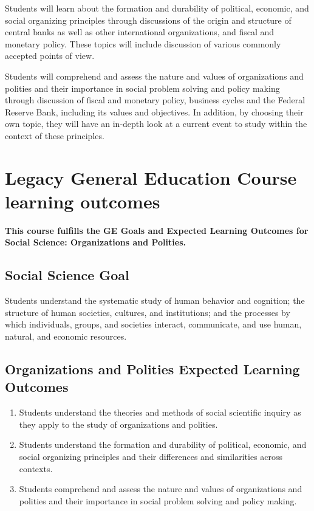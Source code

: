 \documentclass[12pt]{article}
\begin{document}
Students will learn about the formation and durability of political, economic, and social organizing principles through discussions of the origin and structure of central banks as well as other international organizations, and fiscal and monetary policy. These topics will include discussion of various commonly accepted points of view.

Students will comprehend and assess the nature and values of organizations and polities and their importance in social problem solving and policy making through discussion of fiscal and monetary policy, business cycles and the Federal Reserve Bank, including its values and objectives. In addition, by choosing their own topic, they will have an in-depth look at a current event to study within the context of these principles.

\newpage

\section*{Legacy General Education Course learning outcomes}

\textbf{This course fulfills the GE Goals and Expected Learning Outcomes for Social Science: Organizations and Polities.}

\subsection*{Social Science Goal}

Students understand the systematic study of human behavior and cognition; the structure of human societies, cultures, and institutions; and the processes by which individuals, groups, and societies interact, communicate, and use human, natural, and economic resources.

\subsection*{Organizations and Polities Expected Learning Outcomes}
\begin{enumerate}
    \item Students understand the theories and methods of social scientific inquiry as they apply to the study of organizations and polities.
    \item Students understand the formation and durability of political, economic, and social organizing principles and their differences and similarities across contexts.
    \item Students comprehend and assess the nature and values of organizations and polities and their importance in social problem solving and policy making.
\end{enumerate}
\end{document}

